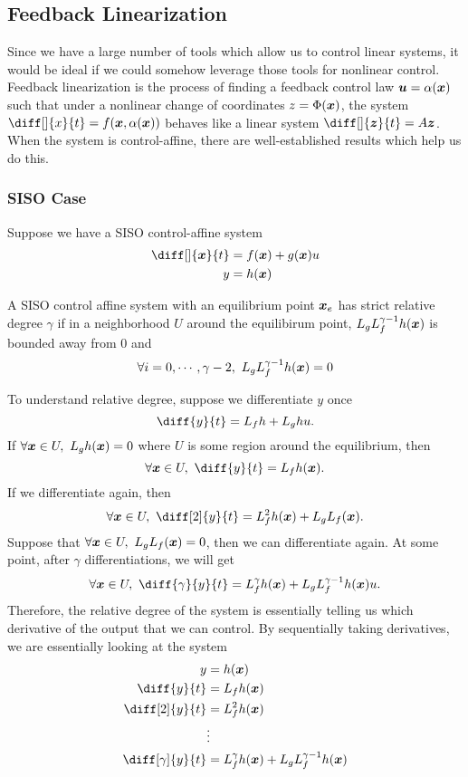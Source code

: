 \subsection{Feedback Linearization}
Since we have a large number of tools which allow us to control linear systems,
it would be ideal if we could somehow leverage those tools for nonlinear
control. Feedback linearization is the process of finding a feedback control law $\boldsymbol{u} =
\alpha(\boldsymbol{x})$ such that under a nonlinear change of coordinates $z =
\Phi(\boldsymbol{x})$, the system $\diff[]{x}{t} = f(\bs{x}, \alpha(\bs{x}))$ behaves like a linear
system $\diff[]{\bs{z}}{t} = A\bs{z}$. When the system is control-affine, there
are well-established results which help us do this.

\subsubsection{SISO Case}
Suppose we have a SISO control-affine system \[
	\begin{aligned}
		\diff[]{\bs{x}}{t} &= f(\bs{x}) + g(\bs{x})u\\
		y &= h(\bs{x})
	\end{aligned}
\]
\begin{definition}
	A SISO control affine system with an equilibrium point $\boldsymbol{x}_e$ has
	strict relative degree $\gamma$ if in a neighborhood $U$ around the
	equilibirum point, $L_gL_f^{\gamma-1}h(\boldsymbol{x})$ is bounded away from 0 and \[
		\forall i=0,\cdots,\gamma-2,\ L_gL_f^{\gamma - 1}h(\bs{x}) = 0
	\]
	\label{defn:strict-relative-degree}
\end{definition}
To understand relative degree, suppose we differentiate $y$ once \[
	\diff{y}{t} = L_fh + L_gh u.
\]
If $\forall \boldsymbol{x}\in U,\ L_gh(\boldsymbol{x}) = 0$ where $U$ is some region around the
equilibrium, then \[
	\forall \bs{x}\in U,\ \diff{y}{t} = L_fh(\bs{x}).
\]
If we differentiate again, then \[
	\forall \bs{x}\in U,\ \diff[2]{y}{t} = L_f^2h(\bs{x}) + L_gL_f(\bs{x}).
\]
Suppose that $\forall \boldsymbol{x}\in U,\ L_gL_f(\boldsymbol{x}) = 0$, then we can
differentiate again. At some point, after $\gamma$ differentiations, we will
get \[
	\forall \bs{x}\in U,\ \diff{\gamma}{y}{t} = L_f^\gamma h(\bs{x}) +
	L_gL_f^{\gamma-1}h(\bs{x})u.
\]
Therefore, the relative degree of the system is essentially telling us which
derivative of the output that we can control. By sequentially taking
derivatives, we are essentially looking at the system \[
	\begin{aligned}
		y &= h(\bs{x})\\
		\diff{y}{t} &= L_fh(\bs{x})\\
		\diff[2]{y}{t} &= L_f^2h(\bs{x})\\
		&\vdots\\
		\diff[\gamma]{y}{t} &= L_f^\gamma h(\bs{x}) + L_gL_f^{\gamma-1}h(\bs{x})
	\end{aligned}
\]
